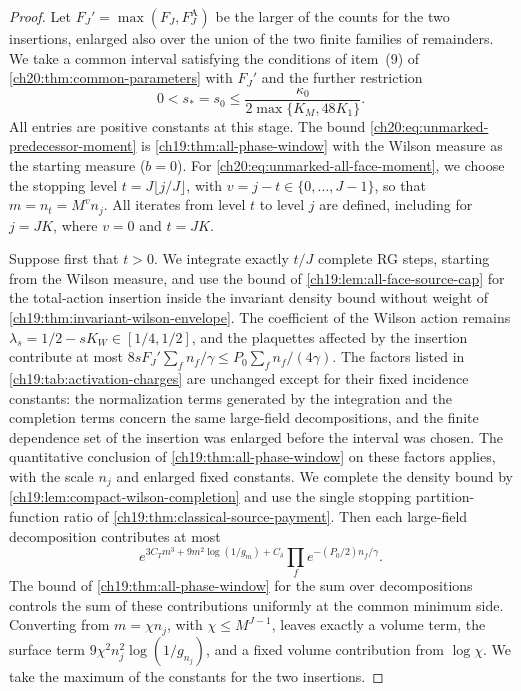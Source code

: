\begin{proof}
Let $F_J'=\max(F_J,F_J^{\mathrm A})$ be the larger of the counts for the two insertions, enlarged also over the union of the two finite families of remainders. We take a common interval satisfying the conditions of item~(9) of \cref{ch20:thm:common-parameters} with $F_J'$ and the further restriction
\[
 0<s_*=s_0\le\frac{\kappa_0}{2\max\{K_M,48K_1\}}.
\]
All entries are positive constants at this stage. The bound \eqref{ch20:eq:unmarked-predecessor-moment} is \cref{ch19:thm:all-phase-window} with the Wilson measure as the starting measure ($b=0$). For \eqref{ch20:eq:unmarked-all-face-moment}, we choose the stopping level $t=J\lfloor j/J\rfloor$, with $v=j-t\in\{0,\dots,J-1\}$, so that $m=n_t=M^vn_j$. All iterates from level $t$ to level $j$ are defined, including for $j=JK$, where $v=0$ and $t=JK$.

Suppose first that $t>0$. We integrate exactly $t/J$ complete RG steps, starting from the Wilson measure, and use the bound of \cref{ch19:lem:all-face-source-cap} for the total-action insertion inside the invariant density bound without weight of \cref{ch19:thm:invariant-wilson-envelope}. The coefficient of the Wilson action remains $\lambda_s=1/2-sK_W\in[1/4,1/2]$, and the plaquettes affected by the insertion contribute at most $8sF_J'\sum_fn_f/\gamma\le P_0\sum_fn_f/(4\gamma)$. The factors listed in \cref{ch19:tab:activation-charges} are unchanged except for their fixed incidence constants: the normalization terms generated by the integration and the completion terms concern the same large-field decompositions, and the finite dependence set of the insertion was enlarged before the interval was chosen. The quantitative conclusion of \cref{ch19:thm:all-phase-window} on these factors applies, with the scale $n_j$ and enlarged fixed constants. We complete the density bound by \cref{ch19:lem:compact-wilson-completion} and use the single stopping partition-function ratio of \cref{ch19:thm:classical-source-payment}. Then each large-field decomposition contributes at most
\[
 e^{3C_Tm^3+9m^2\log(1/g_m)+C_\delta}\prod_fe^{-(P_0/2)n_f/\gamma}.
\]
The bound of \cref{ch19:thm:all-phase-window} for the sum over decompositions controls the sum of these contributions uniformly at the common minimum side. Converting from $m=\chi n_j$, with $\chi\le M^{J-1}$, leaves exactly a volume term, the surface term $9\chi^2n_j^2\log(1/g_{n_j})$, and a fixed volume contribution from $\log\chi$. We take the maximum of the constants for the two insertions.


\end{proof}
